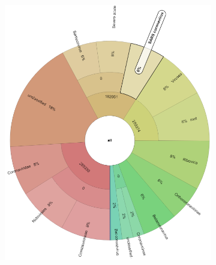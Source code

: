 \begin{figure}[H]
\begin{subfigure}[b]{0.45\textwidth}
        \includegraphics[width=1\textwidth]{figures/results/real/krona/krona-us-sSRR18300811.png}
        \label{fig:results:real:krona-us-b}
        \end{subfigure}
        \hfill
        \begin{subfigure}[b]{0.47\textwidth}

\end{subfigure}
\end{figure}
